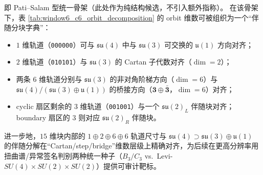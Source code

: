 即 Pati--Salam 型统一骨架（此处作为纯结构候选，不引入额外指称）。
在该骨架下，表 \ref{tab:window6_c6_orbit_decomposition} 的 orbit 维数可被组织为一个“伴随分块字典”：
\begin{itemize}
  \item \(1\) 维轨道（\texttt{000000}）可与 \(\mathfrak{su}(4)\) 中与 \(\mathfrak{su}(3)\) 可交换的 \(\mathfrak{u}(1)\) 方向对齐；
  \item \(2\) 维轨道（\texttt{010101}）与 \(\mathfrak{su}(3)\) 的 Cartan 子代数对齐（\(\dim=2\)）；
  \item 两条 \(6\) 维轨道分别与 \(\mathfrak{su}(3)\) 的非对角阶梯方向（\(\dim=6\)）与
  \(\mathfrak{su}(4)/(\mathfrak{su}(3)\oplus\mathfrak{u}(1))\) 的桥接方向（\(\mathbf{3}\oplus\bar{\mathbf{3}}\)，\(\dim=6\)）对齐；
  \item cyclic 扇区剩余的 \(3\) 维轨道（\texttt{001001}）与一个 \(\mathfrak{su}(2)_L\) 伴随块对齐；boundary 扇区的 \(3\) 则对应 \(\mathfrak{su}(2)_R\) 伴随块。
\end{itemize}
进一步地，\(15\) 维块内部的 \(1\oplus 2\oplus 6\oplus 6\) 轨道尺寸与
\(
\mathfrak{su}(4)\supset \mathfrak{su}(3)\oplus \mathfrak{u}(1)
\)
的伴随分解在“Cartan/step/bridge”维数层级上精确对齐，为后续在更高分辨率用扭曲谱/异常签名判别两种统一种子（\(B_3/C_3\) vs.\ Levi-\(SU(4)\times SU(2)\times SU(2)\)）提供可审计靶标。

